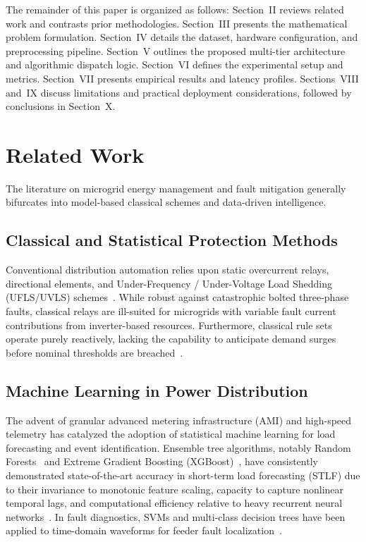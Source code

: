 \documentclass[journal,10pt,twocolumn]{IEEEtran}
\begin{document}
The remainder of this paper is organized as follows: Section~II reviews related work and contrasts prior methodologies. Section~III presents the mathematical problem formulation. Section~IV details the dataset, hardware configuration, and preprocessing pipeline. Section~V outlines the proposed multi-tier architecture and algorithmic dispatch logic. Section~VI defines the experimental setup and metrics. Section~VII presents empirical results and latency profiles. Sections~VIII and~IX discuss limitations and practical deployment considerations, followed by conclusions in Section~X.

\section{Related Work}
The literature on microgrid energy management and fault mitigation generally bifurcates into model-based classical schemes and data-driven intelligence.

\subsection{Classical and Statistical Protection Methods}
Conventional distribution automation relies upon static overcurrent relays, directional elements, and Under-Frequency / Under-Voltage Load Shedding (UFLS/UVLS) schemes~\cite{bollen2000understanding, alwakeel2016state}. While robust against catastrophic bolted three-phase faults, classical relays are ill-suited for microgrids with variable fault current contributions from inverter-based resources. Furthermore, classical rule sets operate purely reactively, lacking the capability to anticipate demand surges before nominal thresholds are breached~\cite{siano2014demand}.

\subsection{Machine Learning in Power Distribution}
The advent of granular advanced metering infrastructure (AMI) and high-speed telemetry has catalyzed the adoption of statistical machine learning for load forecasting and event identification. Ensemble tree algorithms, notably Random Forests~\cite{breiman2001random} and Extreme Gradient Boosting (XGBoost)~\cite{chen2016xgboost}, have consistently demonstrated state-of-the-art accuracy in short-term load forecasting (STLF) due to their invariance to monotonic feature scaling, capacity to capture nonlinear temporal lags, and computational efficiency relative to heavy recurrent neural networks~\cite{mocanu2016deep}. In fault diagnostics, SVMs and multi-class decision trees have been applied to time-domain waveforms for feeder fault localization~\cite{aravanis2018time}.
\end{document}
